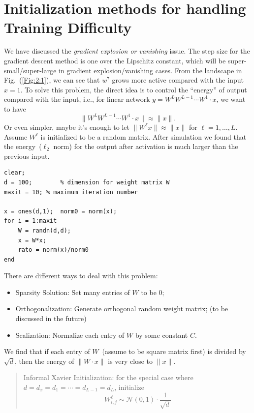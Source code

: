 \section{Initialization methods for handling Training Difficulty}\label{sec:2:3}
We have discussed the \emph{gradient explosion or vanishing} issue. The step size for the gradient descent method is one over the Lipschitz constant, which will be super-small/super-large in gradient explosion/vanishing cases. From the landscape in Fig.~(\ref{Fig:2:1}), we can see that $w^7$ grows more active compared with the input $x=1$. 
To solve this problem, the direct idea is to control the ``energy'' of output compared with the input, i.e., for linear network $y=W^LW^{L-1}\cdots W^1\cdot x$,
we want to have
\[
\|W^LW^{L-1}\cdots W^1\cdot x\|\approx\|x\|.
\]
Or even simpler, maybe it's enough to let $\|W^{\ell}x\|\approx\|x\|$ for $\ell=1,\dots,L$.
Assume $W^{\ell}$ is initialized to be a random matrix.
After simulation we found that the energy~($\ell_2$ norm) for the output after activation is much larger than the previous input.
\begin{verbatim}
clear;
d = 100;		% dimension for weight matrix W
maxit = 10;	% maximum iteration number	

x = ones(d,1);  norm0 = norm(x);
for i = 1:maxit
    W = randn(d,d);
    x = W*x;
    rato = norm(x)/norm0
end
\end{verbatim}
There are different ways to deal with this problem:
\begin{itemize}
\item
Sparsity Solution: Set many entries of $W$ to be $0$;
\item
Orthogonalization: Generate orthogonal random weight matrix; (to be discussed in the future)
\item
Scalization: Normalize each entry of $W$ by some constant $C$.
\end{itemize}
We find that if each entry of $W$~(assume to be square matrix first) is divided by $\sqrt{d}$, then the energy of $\|W\cdot x\|$ is very close to $\|x\|$.

\begin{quotation}
Informal Xavier Initialization:
for the special case where $d=d_x=d_1=\cdots=d_{L-1}=d_L$, initialize
\begin{equation*}
W^{\ell}_{i,j}\sim\mathcal{N}(0,1)\cdot\frac{1}{\sqrt{d}}
\end{equation*}
\end{quotation}
